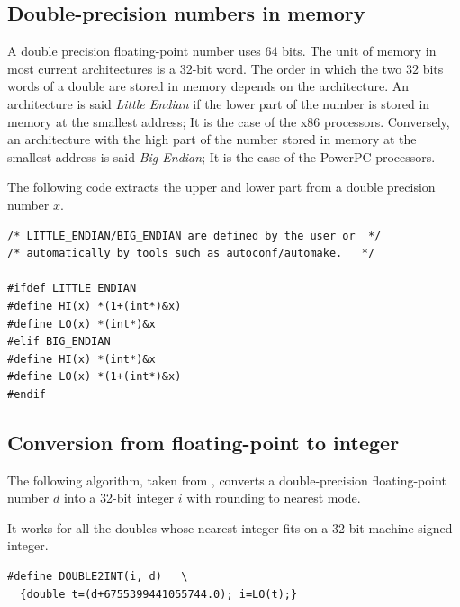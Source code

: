 \subsection{Double-precision numbers in memory\label{section:memory}}

A double precision floating-point number uses $64$ bits. The unit of memory in most current
architectures is a 32-bit word. The
order in which the two $32$ bits words of a double are stored in memory  depends on
the architecture. An architecture is said \emph{Little Endian} if the
lower part of the number is stored in memory at the smallest address;
It is the case of the x86 processors. Conversely, an architecture
with the high part of the number stored in memory at the smallest
address is said \emph{Big Endian}; It is the case of the PowerPC
processors.


The following code extracts the upper and lower part from a double
precision number $x$.

\begin{lstlisting}[label={chap0:lst:endian},
  caption={Extract upper and lower part of a double precision number $x$},firstnumber=1]
/* LITTLE_ENDIAN/BIG_ENDIAN are defined by the user or  */
/* automatically by tools such as autoconf/automake.   */

#ifdef LITTLE_ENDIAN
#define HI(x) *(1+(int*)&x)
#define LO(x) *(int*)&x
#elif BIG_ENDIAN
#define HI(x) *(int*)&x
#define LO(x) *(1+(int*)&x)
#endif
\end{lstlisting}



\subsection{Conversion from floating-point to integer \label{sec:double2int}}

\begin{theorem}
  The following algorithm, taken from \cite{AMDoptim2001}, converts a
  double-precision floating-point number $d$ into a 32-bit
  integer $i$ with rounding to nearest mode.

  It works for all the doubles whose nearest integer fits on a 32-bit machine signed integer.

\begin{lstlisting}[label={chap0:lst:conversion2},caption={Conversion from FP to int},firstnumber=1]
#define DOUBLE2INT(i, d)   \
  {double t=(d+6755399441055744.0); i=LO(t);}
\end{lstlisting}
\end{theorem}

